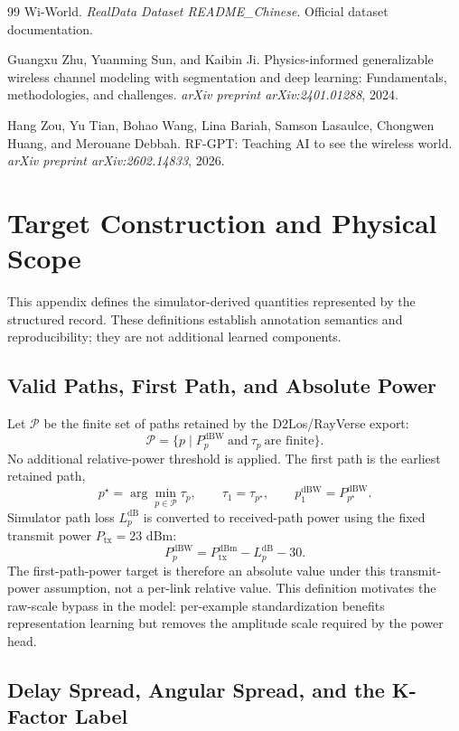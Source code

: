 \begin{thebibliography}{99}
Wi-World. \emph{RealData Dataset README\_Chinese}. Official dataset documentation.

Guangxu Zhu, Yuanming Sun, and Kaibin Ji. Physics-informed generalizable wireless channel
modeling with segmentation and deep learning: Fundamentals, methodologies, and challenges.
\emph{arXiv preprint arXiv:2401.01288}, 2024.

Hang Zou, Yu Tian, Bohao Wang, Lina Bariah, Samson Lasaulce, Chongwen Huang, and Merouane
Debbah. RF-GPT: Teaching AI to see the wireless world. \emph{arXiv preprint
arXiv:2602.14833}, 2026.

\end{thebibliography}

\clearpage
\appendices

\section{Target Construction and Physical Scope}

This appendix defines the simulator-derived quantities represented by the structured record. These
definitions establish annotation semantics and reproducibility; they are not additional learned
components.

\subsection{Valid Paths, First Path, and Absolute Power}

Let $\mathcal P$ be the finite set of paths retained by the D2Los/RayVerse export:
\[
\mathcal P=\{p\mid P_p^{\mathrm{dBW}}\ \text{and}\ \tau_p\ \text{are finite}\}.
\]
No additional relative-power threshold is applied. The first path is the earliest retained path,
\[
p^\star=\arg\min_{p\in\mathcal P}\tau_p,
\qquad
\tau_1=\tau_{p^\star},
\qquad
p_1^{\mathrm{dBW}}=P_{p^\star}^{\mathrm{dBW}}.
\]
Simulator path loss $L_p^{\mathrm{dB}}$ is converted to received-path power using the fixed transmit
power $P_{\mathrm{tx}}=23$ dBm:
\[
P_p^{\mathrm{dBW}}=P_{\mathrm{tx}}^{\mathrm{dBm}}-L_p^{\mathrm{dB}}-30.
\]
The first-path-power target is therefore an absolute value under this transmit-power assumption, not
a per-link relative value. This definition motivates the raw-scale bypass in the model: per-example
standardization benefits representation learning but removes the amplitude scale required by the power
head.

\subsection{Delay Spread, Angular Spread, and the K-Factor Label}

